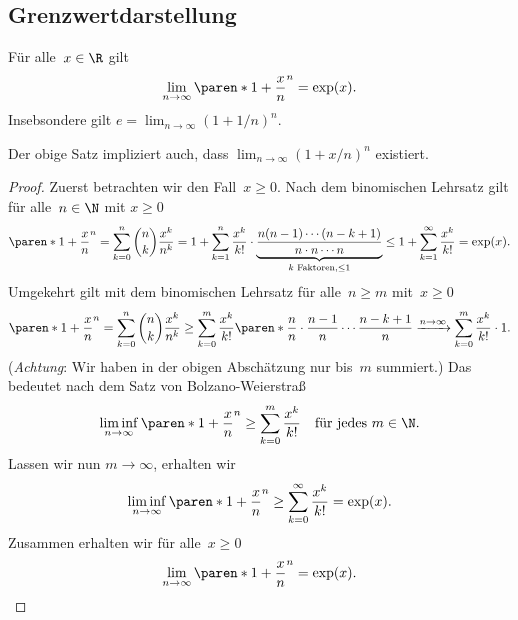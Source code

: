 \documentclass[a4paper]{article}
\begin{document}
\subsection{Grenzwertdarstellung}

\begin{theorem}
    Für alle~$x \in \R$ gilt
    \begin{equation*}
        \lim_{n\to\infty} \paren*{1+\frac{x}{n}}^n = \exp(x).
    \end{equation*}
    Insebsondere gilt $e = \lim_{n\to\infty} (1+1/n)^n$.
\end{theorem}

Der obige Satz impliziert auch, dass $\lim_{n\to\infty} (1+x/n)^n$ existiert.

\begin{proof}
    Zuerst betrachten wir den Fall~$x \geq 0$. Nach dem binomischen Lehrsatz gilt für alle~$n \in \N$ mit $x \geq 0$
    \begin{equation*}
        \paren*{1+\frac{x}{n}}^n = \sum_{k=0}^n \binom{n}{k} \frac{x^k}{n^k} = 1 + \sum_{k=1}^n \frac{x^k}{k!} \cdot \underbrace{\frac{n(n-1)\cdots(n-k+1)}{n\cdot n\cdots n}}_{k\text{ Faktoren}, \leq 1} \leq 1 + \sum_{k=1}^\infty \frac{x^k}{k!} = \exp(x).
    \end{equation*}
    Umgekehrt gilt mit dem binomischen Lehrsatz für alle~$n \geq m$ mit~$x \geq 0$
    \begin{equation*}
        \paren*{1+\frac{x}{n}}^n = \sum_{k=0}^n \binom{n}{k} \frac{x^k}{n^k} \geq \sum_{k=0}^m \frac{x^k}{k!} \paren*{\frac{n}{n}\cdot\frac{n-1}{n}\cdots\frac{n-k+1}{n}} \xrightarrow{n\to\infty} \sum_{k=0}^m \frac{x^k}{k!} \cdot 1.
    \end{equation*}
    (\emph{Achtung}: Wir haben in der obigen Abschätzung nur bis~$m$ summiert.) Das bedeutet nach dem Satz von Bolzano-Weierstraß
    \begin{equation*}
        \liminf_{n\to\infty} \paren*{1+\frac{x}{n}}^n \geq \sum_{k=0}^m \frac{x^k}{k!} \quad\text{für jedes } m \in \N.
    \end{equation*}
    Lassen wir nun $m \to \infty$, erhalten wir
    \begin{equation*}
        \liminf_{n\to\infty} \paren*{1+\frac{x}{n}}^n \geq \sum_{k=0}^\infty \frac{x^k}{k!} = \exp(x).
    \end{equation*}
    Zusammen erhalten wir für alle~$x \geq 0$
    \begin{equation*}
        \lim_{n\to\infty} \paren*{1+\frac{x}{n}}^n = \exp(x).
    \end{equation*}


\end{proof}
\end{document}

